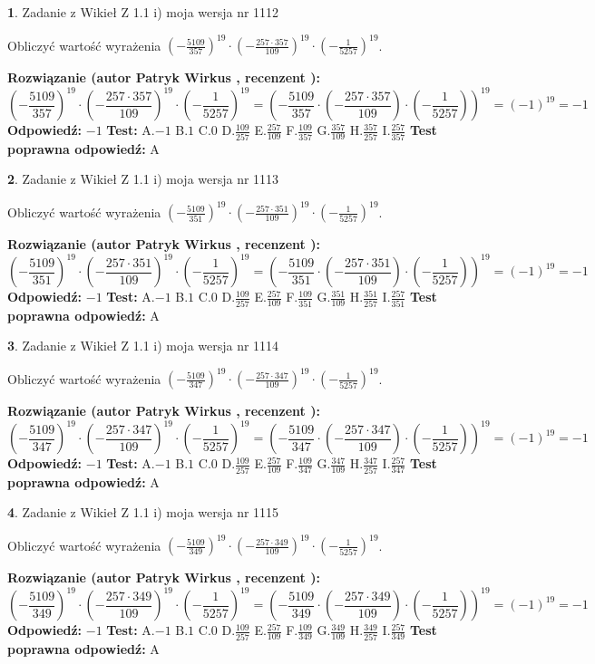 \documentclass[12pt, a4paper]{article}
\theoremstyle{definition} %
\newtheorem{zad}{}
\newcommand{\zadStart}[1]{\begin{zad}#1\newline}
\newcommand{\zadStop}{\end{zad}}
\newcommand{\rozwStart}[2]{\noindent \textbf{Rozwiązanie (autor #1 , recenzent #2): }\newline}
\newcommand{\rozwStop}{\newline}
\newcommand{\odpStart}{\noindent \textbf{Odpowiedź:}\newline}
\newcommand{\odpStop}{\newline}
\newcommand{\testStart}{\noindent \textbf{Test:}\newline}
\newcommand{\testStop}{\newline}
\newcommand{\kluczStart}{\noindent \textbf{Test poprawna odpowiedź:}\newline}
\newcommand{\kluczStop}{\newline}
\begin{document}
\zadStart{Zadanie z Wikieł Z 1.1 i) moja wersja nr 1112}

Obliczyć wartość wyrażenia $(-\frac{5109}{357})^{19} \cdot (-\frac{257 \cdot 357}{109})^{19} \cdot (-\frac{1}{5257})^{19}$.
\zadStop
\rozwStart{Patryk Wirkus}{}
$$(-\frac{5109}{357})^{19} \cdot (-\frac{257 \cdot 357}{109})^{19} \cdot (-\frac{1}{5257})^{19} = (-\frac{5109}{357} \cdot (-\frac{257 \cdot 357}{109}) \cdot (-\frac{1}{5257}))^{19} = (-1)^{19} = -1$$
\rozwStop
\odpStart
$-1$
\odpStop
\testStart
A.$-1$ B.$1$ C.$0$ D.$\frac{109}{257}$ E.$\frac{257}{109}$
F.$\frac{109}{357}$ G.$\frac{357}{109}$
H.$\frac{357}{257}$
I.$\frac{257}{357}$
\testStop
\kluczStart
A
\kluczStop



\zadStart{Zadanie z Wikieł Z 1.1 i) moja wersja nr 1113}

Obliczyć wartość wyrażenia $(-\frac{5109}{351})^{19} \cdot (-\frac{257 \cdot 351}{109})^{19} \cdot (-\frac{1}{5257})^{19}$.
\zadStop
\rozwStart{Patryk Wirkus}{}
$$(-\frac{5109}{351})^{19} \cdot (-\frac{257 \cdot 351}{109})^{19} \cdot (-\frac{1}{5257})^{19} = (-\frac{5109}{351} \cdot (-\frac{257 \cdot 351}{109}) \cdot (-\frac{1}{5257}))^{19} = (-1)^{19} = -1$$
\rozwStop
\odpStart
$-1$
\odpStop
\testStart
A.$-1$ B.$1$ C.$0$ D.$\frac{109}{257}$ E.$\frac{257}{109}$
F.$\frac{109}{351}$ G.$\frac{351}{109}$
H.$\frac{351}{257}$
I.$\frac{257}{351}$
\testStop
\kluczStart
A
\kluczStop



\zadStart{Zadanie z Wikieł Z 1.1 i) moja wersja nr 1114}

Obliczyć wartość wyrażenia $(-\frac{5109}{347})^{19} \cdot (-\frac{257 \cdot 347}{109})^{19} \cdot (-\frac{1}{5257})^{19}$.
\zadStop
\rozwStart{Patryk Wirkus}{}
$$(-\frac{5109}{347})^{19} \cdot (-\frac{257 \cdot 347}{109})^{19} \cdot (-\frac{1}{5257})^{19} = (-\frac{5109}{347} \cdot (-\frac{257 \cdot 347}{109}) \cdot (-\frac{1}{5257}))^{19} = (-1)^{19} = -1$$
\rozwStop
\odpStart
$-1$
\odpStop
\testStart
A.$-1$ B.$1$ C.$0$ D.$\frac{109}{257}$ E.$\frac{257}{109}$
F.$\frac{109}{347}$ G.$\frac{347}{109}$
H.$\frac{347}{257}$
I.$\frac{257}{347}$
\testStop
\kluczStart
A
\kluczStop



\zadStart{Zadanie z Wikieł Z 1.1 i) moja wersja nr 1115}

Obliczyć wartość wyrażenia $(-\frac{5109}{349})^{19} \cdot (-\frac{257 \cdot 349}{109})^{19} \cdot (-\frac{1}{5257})^{19}$.
\zadStop
\rozwStart{Patryk Wirkus}{}
$$(-\frac{5109}{349})^{19} \cdot (-\frac{257 \cdot 349}{109})^{19} \cdot (-\frac{1}{5257})^{19} = (-\frac{5109}{349} \cdot (-\frac{257 \cdot 349}{109}) \cdot (-\frac{1}{5257}))^{19} = (-1)^{19} = -1$$
\rozwStop
\odpStart
$-1$
\odpStop
\testStart
A.$-1$ B.$1$ C.$0$ D.$\frac{109}{257}$ E.$\frac{257}{109}$
F.$\frac{109}{349}$ G.$\frac{349}{109}$
H.$\frac{349}{257}$
I.$\frac{257}{349}$
\testStop
\kluczStart
A
\kluczStop
\end{document}
